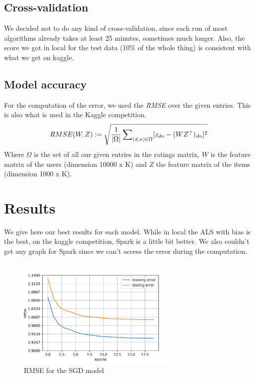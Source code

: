 \documentclass[a4paper]{article}
\begin{document}
\subsection{Cross-validation}
We decided not to do any kind of cross-validation, since each run of most algorithms already takes at least 25 minutes, sometimes much longer.
Also, the score we got in local for the test data (10\% of the whole thing) is consistent with what we get on kaggle.

\subsection{Model accuracy}
For the computation of the error, we used the \textit{RMSE} over the given entries. This is also what is used in the Kaggle competition.  
$$ RMSE(W, Z) := \sqrt{\frac{1}{|\Omega|} \sum\nolimits_{(d, n) \in \Omega} [\textit{x\textsubscript{dn}} - (WZ^\top)\textsubscript{\textit{dn}}]^2} $$
Where \(\Omega\) is the set of all our given entries in the ratings matrix, \(W\) is the feature matrix of the users (dimension 10000 x K) and \(Z\) the feature matrix of the items (dimension 1000 x K).






\section{Results}
We give here our best results for each model.
While in local the ALS with bias is the best, on the kaggle competition, Spark is a little bit better. We also couldn't get any graph for Spark since we can't access the error during the computation.
\mbox{}\\
\begin{figure}[h]
  \centering
  \includegraphics[width=8cm]{RMSE_SGD.png}
  \caption{RMSE for the SGD model}
  \label{fig:figure 2}
\end{figure}
\end{document}
